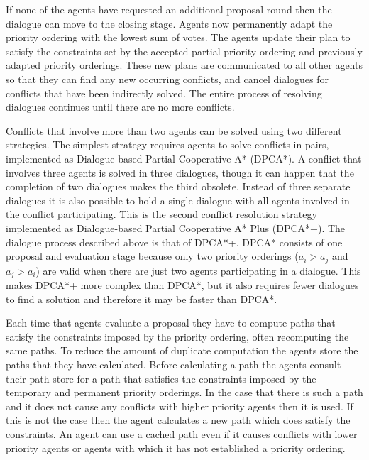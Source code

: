 If none of the agents have requested an additional proposal round then the 
dialogue can move to the closing stage. Agents now permanently adapt the 
priority ordering with the lowest sum of votes. The agents update their plan to 
satisfy the constraints set by the accepted partial priority ordering and 
previously adapted priority orderings. These new 
plans are communicated to all other agents so that they can find any new 
occurring conflicts, and cancel dialogues for conflicts that have been 
indirectly solved. The entire process of resolving dialogues 
continues until there are no more conflicts.

Conflicts that involve more than two agents can be solved using two different
strategies. The simplest strategy requires agents to solve conflicts in pairs, implemented 
as Dialogue-based Partial Cooperative A* (DPCA*). A conflict that involves
three agents is solved in three dialogues, though it can happen that the 
completion of two dialogues makes the third obsolete. 
Instead of three 
separate dialogues it is also possible to hold a single dialogue with all 
agents involved in the conflict participating. This is the second conflict resolution strategy implemented as Dialogue-based Partial Cooperative A* Plus (DPCA*+). The dialogue process 
described above is that of DPCA*+. DPCA* consists of one proposal and 
evaluation stage because only two priority orderings ($a_i > a_j$ and $a_j > 
a_i$) 
are valid when there 
are just two agents participating in a dialogue.
This makes DPCA*+ more complex than DPCA*, but it also requires fewer dialogues 
to find a solution and therefore it may be faster than DPCA*.

Each time that agents evaluate a proposal they have to compute paths that
satisfy the constraints imposed by the priority ordering, often recomputing
the same paths. To reduce the amount of duplicate computation the
agents store the paths that they have calculated. Before calculating a path
the agents consult their path store for a path that satisfies the
constraints imposed by the temporary and permanent priority orderings. In the 
case
that there is such a path and it does not cause any conflicts with higher
priority agents then it is used. If this is not the case then the agent
calculates a new path which does satisfy the constraints. An agent can use a 
cached path even if it causes
conflicts with lower priority agents or agents with which it has not
established a priority ordering.

